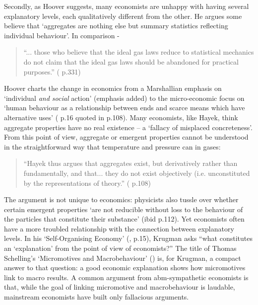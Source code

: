 Secondly, as Hoover suggests, many economists are unhappy with having several explanatory levels, each qualitatively different from the other. He argues some believe that `aggregates are nothing else but summary statistics reflecting individual behaviour'. In comparison -

\begin{quote}
``... those who believe that the ideal gas laws reduce to statistical mechanics do not claim that the ideal gas laws should be abandoned for practical purposes.'' (\citealt{hoover_idealizing_2010} p.331)
\end{quote}

Hoover charts the change in economics from a Marshallian emphasis on `individual \emph{and social} action' (emphasis added) to the micro-economic focus on `human behaviour as a relationship between ends and scarce means which have alternative uses' (\citealt{robbins_essays_1935} p.16 quoted in \citealt{hoover_causality_2001} p.108). Many economists, like Hayek, think aggregate properties have no real existence – a `fallacy of misplaced concreteness'. From this point of view, aggregate or emergent properties cannot be understood in the straightforward way that temperature and pressure can in gases: 

\begin{quote}
``Hayek thus argues that aggregates exist, but derivatively rather than fundamentally, and that... they do not exist objectively (i.e. unconstituted by the representations of theory.'' (\citealt{hoover_causality_2001} p.108)
\end{quote}

The argument is not unique to economics: physicists also tussle over whether certain emergent properties `are not reducible without loss to the behaviour of the particles that constitute their substance' (ibid p.112). Yet economists often have a more troubled relationship with the connection between explanatory levels. In his `Self-Organising Economy' (\citealt{krugman_self_1996}, p.15), Krugman asks ``what constitutes an `explanation' from the point of view of economists?'' The title of Thomas Schelling's `Micromotives and Macrobehaviour' (\citeyear{schelling_micromotives_1978}) is, for Krugman, a compact answer to that question: a good economic explanation shows how micromotives link to macro results. A common argument from \gls{abm}-sympathetic economists is that, while the goal of linking micromotive and macrobehaviour is laudable, mainstream economists have built only fallacious arguments. 

